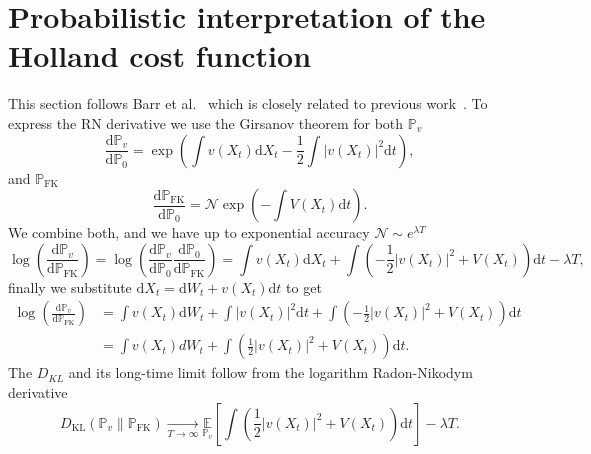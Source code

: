 \section{Probabilistic interpretation of the Holland cost function}
\label{app:holland-prob}
This section follows Barr et al.~\cite{barr2020quantum} which is closely related to previous work~\cite{dai1990markov}. To express the RN derivative we use the Girsanov theorem for both $\mathbb{P}_v$
\begin{equation}
	\frac{\mathrm{d} \mathbb{P}_{v}}{\mathrm{d} \mathbb{P}_{0}}=\exp \left(\int v\left(X_{t}\right) \mathrm{d} X_{t}-\frac{1}{2} \int\left|v\left(X_{t}\right)\right|^{2} \mathrm{d} t\right),
\end{equation}
and $\mathbb{P}_{\mathrm{FK}}$
\begin{equation}
	\label{eq:a-hp2}
	\frac{\mathrm{d} \mathbb{P}_{\mathrm{FK}}}{\mathrm{d} \mathbb{P}_{0}}=\mathcal{N} \exp \left(-\int V\left(X_{t}\right) \mathrm{d} t\right).
\end{equation}
We combine both, and we have up to exponential accuracy $\mathcal{N} \sim e^{\lambda T}$
\begin{equation}
	\log \left(\frac{\mathrm{d} \mathbb{P}_{v}}{\mathrm{d} \mathbb{P}_{\mathrm{FK}}}\right)=\log \left(\frac{\mathrm{d} \mathbb{P}_{v}}{\mathrm{d} \mathbb{P}_{0}} \frac{\mathrm{d} \mathbb{P}_{0}}{\mathrm{d} \mathbb{P}_{\mathrm{FK}}}\right) = \int v\left(X_{t}\right) \mathrm{d} X_{t}+\int \left(-\frac{1}{2}\left|v\left(X_{t}\right)\right|^{2}+V\left(X_{t}\right)\right)\mathrm{d} t - \lambda T,
\end{equation}
finally we substitute $\mathrm{d} X_t = \mathrm{d}W_t + v(X_t)\mathrm{d}t$ to get
\begin{equation}
	\begin{aligned}
	\log \left(\frac{\mathrm{d} \mathbb{P}_{v}}{\mathrm{d} \mathbb{P}_{\mathrm{FK}}}\right) 
	& =  \int v\left(X_{t}\right) \mathrm{d} W_{t} + \int |v(X_t)|^2 \mathrm{d}t + \int \left(-\frac{1}{2}\left|v\left(X_{t}\right)\right|^{2}+V\left(X_{t}\right)\right)\mathrm{d} t\\
	& =  \int v\left(X_{t}\right) d W_{t}+\int \left(\frac{1}{2}\left|v\left(X_{t}\right)\right|^{2}+V\left(X_{t}\right)\right) \mathrm{d}t.
	\end{aligned}
\end{equation}
The $D_{KL}$ and its long-time limit follow from the logarithm Radon-Nikodym derivative
\begin{equation}
	D_{\mathrm{KL}}\left(\mathbb{P}_{v} \| \mathbb{P}_{\mathrm{FK}}\right) 
	\underset{T \rightarrow \infty}{\longrightarrow} \underset{\mathbb{P}_{v}}{\mathbb{E}}\left[\int  \left(\frac{1}{2}\left|v\left(X_{t}\right)\right|^{2}+V\left(X_{t}\right)\right)\mathrm{d}t \right]-\lambda T.
\end{equation}
